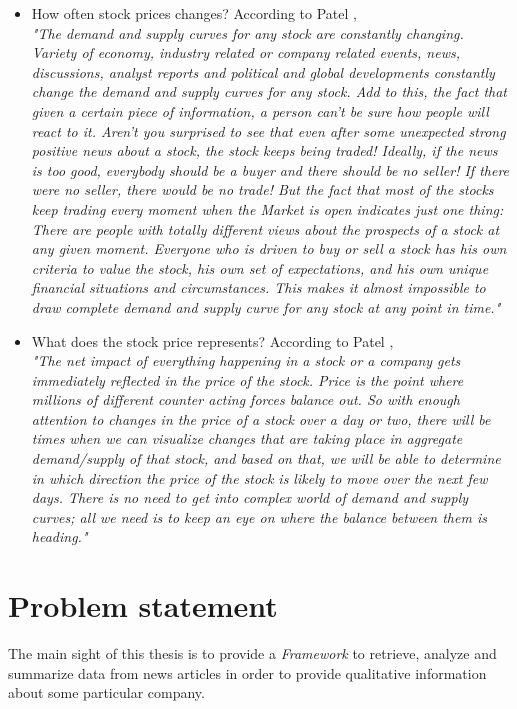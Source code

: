 \begin{itemize}
		\item How often stock prices changes?
		According to Patel \cite[p. 24,25]{P2007}, \\ \emph{"The demand and supply curves for any stock are constantly changing. Variety of economy, industry related or company related events, news, discussions, analyst reports and political and global developments constantly change the demand and supply curves for any stock. Add to this, the fact that given a certain piece of information, a person can’t be sure how people will react to it. Aren’t you surprised to see that even after some unexpected strong positive news about a stock, the stock keeps being traded! Ideally, if the news is too good, everybody should be a buyer and there should be no seller! If there were no seller, there would be no trade! But the fact that most of the stocks keep trading every moment when the Market is open indicates just one thing: There are people with totally different views about the prospects of a stock at any given moment. Everyone who is driven to buy or sell a stock has his own criteria to value the stock, his own set of expectations, and his own unique financial situations and circumstances. This makes it almost impossible to draw complete demand and supply curve for any stock at any point in time."}
		
		\item What does the stock price represents?
		According to Patel \cite[p. 25]{P2007}, \\ \emph{"The net impact of everything happening in a stock or a company gets immediately reflected in the price of the stock. Price is the point where millions of different counter acting forces balance out. So with enough attention to changes in the price of a stock over a day or two, there will be times when we can visualize changes that are taking place in aggregate demand/supply of that stock, and based on that, we will be able to determine in which direction the price of the stock is likely to move over the next few days. There is no need to get into complex world of demand and supply curves; all we need is to keep an eye on where the balance between them is heading."}
	\end{itemize}

	\section{Problem statement}
	
	The main sight of this thesis is to  provide a \emph{Framework} to retrieve, analyze and summarize data from news articles in order to provide qualitative information about some particular company.  

